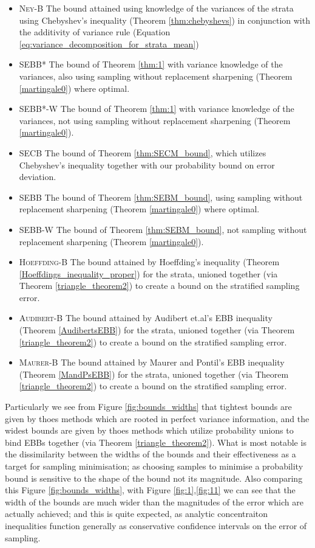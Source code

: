 \begin{itemize}
\item 
\textsc{Ney-B} The bound attained using knowledge of the variances of the strata using Chebyshev's inequality (Theorem \ref{thm:chebyshevs}) in conjunction with the additivity of variance rule (Equation \ref{eq:variance_decomposition_for_strata_mean})
\item 
\textsc{SEBB*} The bound of Theorem \ref{thm:1} with variance knowledge of the variances, also using sampling without replacement sharpening (Theorem \ref{martingale0}) where optimal.
\item 
\textsc{SEBB*-W} The bound of Theorem \ref{thm:1} with variance knowledge of the variances, not using sampling without replacement sharpening (Theorem \ref{martingale0}).
\item 
\textsc{SECB} The bound of Theorem \ref{thm:SECM_bound}, which utilizes Chebyshev's inequality together with our probability bound on error deviation.
\item 
\textsc{SEBB} The bound of Theorem \ref{thm:SEBM_bound}, using sampling without replacement sharpening (Theorem \ref{martingale0}) where optimal.
\item 
\textsc{SEBB-W} The bound of Theorem \ref{thm:SEBM_bound}, not sampling without replacement sharpening (Theorem \ref{martingale0}).
\item 
\textsc{Hoeffding-B} The bound attained by Hoeffding's inequality (Theorem \ref{Hoeffdings_inequality_proper}) for the strata, unioned together (via Theorem \ref{triangle_theorem2}) to create a bound on the stratified sampling error.
\item 
\textsc{Audibert-B} The bound attained by Audibert et.al's EBB inequality (Theorem \ref{AudibertsEBB}) for the strata, unioned together (via Theorem \ref{triangle_theorem2}) to create a bound on the stratified sampling error.
\item 
\textsc{Maurer-B} The bound attained by Maurer and Pontil's EBB inequality (Theorem \ref{MandPsEBB}) for the strata, unioned together (via Theorem \ref{triangle_theorem2}) to create a bound on the stratified sampling error.
\end{itemize}

Particularly we see from Figure \ref{fig:bounds_widths} that tightest bounds are given by thoes methods which are rooted in perfect variance information, and the widest bounds are given by thoes methods which utilize probability unions to bind EBBs together (via Theorem \ref{triangle_theorem2}).
What is most notable is the dissimilarity between the widths of the bounds and their effectiveness as a target for sampling minimisation; as choosing samples to minimise a probability bound is sensitive to the shape of the bound not its magnitude.
Also comparing this Figure \ref{fig:bounds_widths}, with Figure \ref{fig:1},\ref{fig:11} we can see that the width of the bounds are much wider than the magnitudes of the error which are actually achieved; and this is quite expected, as analytic concentraiton inequalities function generally as conservative confidence intervals on the error of sampling.

